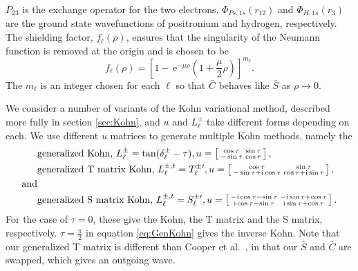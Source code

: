 \documentclass[preprint,showpacs,preprintnumbers,amsmath,amssymb]{revtex4}
\newcommand{\ee} {\,\text{e}}
\newcommand{\ii}{{\rm{i}}}
\begin{document}
 $P_{23}$ is the exchange operator for the two electrons. $\Phi_{Ps,1s}\left(r_{12}\right)$ and $\Phi_{H,1s}\left(r_3\right)$ are the ground state wavefunctions of positronium and hydrogen, respectively. The shielding factor, $f_\ell(\rho)$, ensures that the singularity of the Neumann function is removed at the origin and is chosen to be
\begin{equation}
f_\ell(\rho) = \left[1 - \ee^{-\mu \rho} \left(1+\frac{\mu}{2}\rho\right)\right]^{m_\ell}.
\label{eq:PartialWaveShielding}
\end{equation}
The $m_\ell$ is an integer chosen for each $\ell$ so that $\bar{C}$ behaves like $\bar{S}$ as $\rho \rightarrow 0$.

We consider a number of variants of the Kohn variational method, described more fully in section \ref{sec:Kohn}, and $u$ and $L^{\pm}_\ell$ take different forms depending on each.
We use different $u$ matrices to generate multiple Kohn methods, namely the
\begin{align}
&\text{generalized Kohn, } L^{\pm}_\ell = \tan(\delta^{\pm}_\ell-\tau), u = \left[ \begin{smallmatrix}
\cos \tau & \sin \tau \\  -\sin \tau & \cos \tau
\end{smallmatrix} \right], \label{eq:GenKohn}\\
&\text{generalized T matrix Kohn, } L^{\pm,t}_\ell = T_\ell^{\pm\prime}, u = \left[ \begin{smallmatrix}
\cos\tau & \sin\tau \\ -\sin\tau + \ii \cos\tau & \cos\tau + \ii \sin\tau
\end{smallmatrix} \right], \label{eq:GenTKohn} \\
\text{and}& \nonumber \\
&\text{generalized S matrix Kohn, } L^{\pm,t}_\ell = S_\ell^{\pm\prime}, u = \left[ \begin{smallmatrix}
-\ii \cos\tau - \sin\tau & -\ii\sin\tau + \cos\tau \\ \ii\cos\tau - \sin\tau & \ii\sin\tau + \cos\tau
\end{smallmatrix} \right]. \label{eq:GenSKohn}
\end{align}
For the case of $\tau = 0$, these give the Kohn, the T matrix and the S matrix, respectively. $\tau = \frac{\pi}{2}$ in equation \ref{eq:GenKohn} gives the inverse Kohn. Note that our generalized T matrix is different than Cooper et al.\ \cite{Cooper2010}, in that our $\bar{S}$ and $\bar{C}$ are swapped, which gives an outgoing wave.
\end{document}
